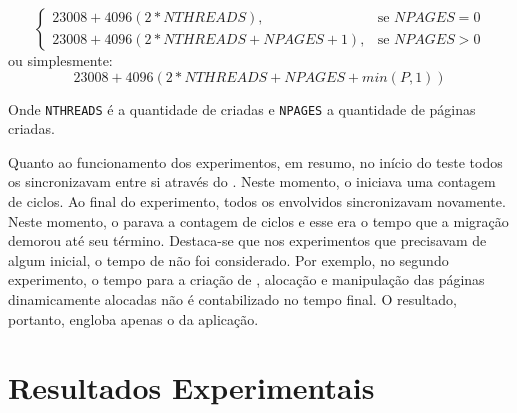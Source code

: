 \[
\begin{cases}
    23008 + 4096(2*NTHREADS),& \text{se } NPAGES= 0\\
    23008 + 4096(2*NTHREADS + NPAGES + 1),& \text{se } NPAGES > 0
\end{cases}
\]
ou simplesmente:
\begin{equation}\label{eq.3}
    23008 + 4096(2*NTHREADS + NPAGES + min(P, 1))
\end{equation}

Onde \texttt{NTHREADS} é a quantidade de \threads criadas e \texttt{NPAGES} a quantidade de páginas criadas.


Quanto ao funcionamento dos experimentos, em resumo, no início do teste todos os \clusters sincronizavam entre si através do \sync. Neste momento, o \iocluster iniciava uma contagem de ciclos. Ao final do experimento, todos os \clusters envolvidos sincronizavam novamente. Neste momento, o \iocluster parava a contagem de ciclos e esse era o tempo que a migração demorou até seu término. Destaca-se que nos experimentos que precisavam de algum \setup inicial, o tempo de \setup não foi considerado. Por exemplo, no segundo experimento, o tempo para a criação de \threads, alocação e manipulação das páginas dinamicamente alocadas não é contabilizado no tempo final. O resultado, portanto, engloba apenas o \downtime da aplicação.



\chapter{Resultados Experimentais}
\label{chap.results}

